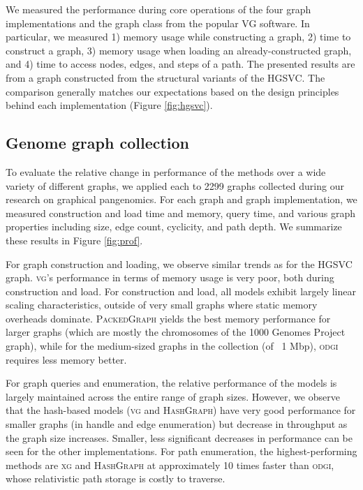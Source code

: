 \documentclass{article}
\begin{document}
We measured the performance during core operations of the four graph implementations and the graph class from the popular VG software.
In particular, we measured 1) memory usage while constructing a graph, 2) time to construct a graph, 3) memory usage when loading an already-constructed graph, and 4) time to access nodes, edges, and steps of a path.
The presented results are from a graph constructed from the structural variants of the HGSVC.
The comparison generally matches our expectations based on the design principles behind each implementation (Figure \ref{fig:hgsvc}).

\subsection{Genome graph collection}

To evaluate the relative change in performance of the methods over a wide variety of different graphs, we applied each to 2299 graphs collected during our research on graphical pangenomics.
For each graph and graph implementation, we measured construction and load time and memory, query time, and various graph properties including size, edge count, cyclicity, and path depth.
We summarize these results in Figure \ref{fig:prof}.

For graph construction and loading, we observe similar trends as for the HGSVC graph.
\textsc{vg}'s performance in terms of memory usage is very poor, both during construction and load.
For construction and load, all models exhibit largely linear scaling characteristics, outside of very small graphs where static memory overheads dominate.
\textsc{PackedGraph} yields the best memory performance for larger graphs (which are mostly the chromosomes of the 1000 Genomes Project graph), while for the medium-sized graphs in the collection (of ~1 Mbp), \textsc{odgi} requires less memory better.

For graph queries and enumeration, the relative performance of the models is largely maintained across the entire range of graph sizes.
However, we observe that the hash-based models (\textsc{vg} and \textsc{HashGraph}) have very good performance for smaller graphs (in handle and edge enumeration) but decrease in throughput as the graph size increases.
Smaller, less significant decreases in performance can be seen for the other implementations.
For path enumeration, the highest-performing methods are \textsc{xg} and \textsc{HashGraph} at approximately 10 times faster than \textsc{odgi}, whose relativistic path storage is costly to traverse.
\end{document}
